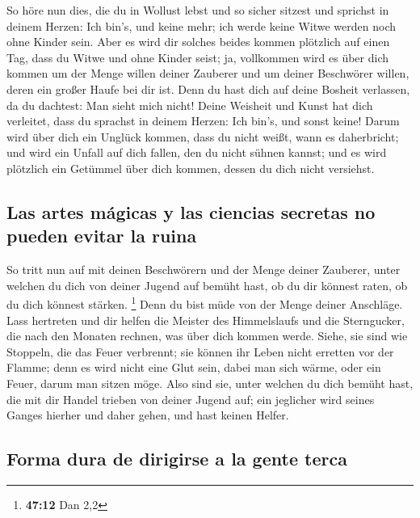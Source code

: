  So höre nun dies, die du in Wollust lebst und so sicher
sitzest und sprichst in deinem Herzen: Ich bin's, und keine mehr; ich
werde keine Witwe werden noch ohne Kinder sein.  Aber es
wird dir solches beides kommen plötzlich auf einen Tag, dass du Witwe
und ohne Kinder seist; ja, vollkommen wird es über dich kommen um der
Menge willen deiner Zauberer und um deiner Beschwörer willen, deren ein
großer Haufe bei dir ist.  Denn du hast dich auf deine
Bosheit verlassen, da du dachtest: Man sieht mich nicht! Deine Weisheit
und Kunst hat dich verleitet, dass du sprachst in deinem Herzen: Ich
bin's, und sonst keine!  Darum wird über dich ein Unglück
kommen, dass du nicht weißt, wann es daherbricht; und wird ein Unfall
auf dich fallen, den du nicht sühnen kannst; und es wird plötzlich ein
Getümmel über dich kommen, dessen du dich nicht versiehst.

\hypertarget{las-artes-muxe1gicas-y-las-ciencias-secretas-no-pueden-evitar-la-ruina}{%
\subsection{Las artes mágicas y las ciencias secretas no pueden evitar
la
ruina}\label{las-artes-muxe1gicas-y-las-ciencias-secretas-no-pueden-evitar-la-ruina}}

 So tritt nun auf mit deinen Beschwörern und der Menge
deiner Zauberer, unter welchen du dich von deiner Jugend auf bemüht
hast, ob du dir könnest raten, ob du dich könnest stärken. \footnote{\textbf{47:12}
  Dan 2,2}  Denn du bist müde von der Menge deiner
Anschläge. Lass hertreten und dir helfen die Meister des Himmelslaufs
und die Sterngucker, die nach den Monaten rechnen, was über dich kommen
werde.  Siehe, sie sind wie Stoppeln, die das Feuer
verbrennt; sie können ihr Leben nicht erretten vor der Flamme; denn es
wird nicht eine Glut sein, dabei man sich wärme, oder ein Feuer, darum
man sitzen möge.  Also sind sie, unter welchen du dich
bemüht hast, die mit dir Handel trieben von deiner Jugend auf; ein
jeglicher wird seines Ganges hierher und daher gehen, und hast keinen
Helfer.

\hypertarget{forma-dura-de-dirigirse-a-la-gente-terca}{%
\subsection{Forma dura de dirigirse a la gente
terca}\label{forma-dura-de-dirigirse-a-la-gente-terca}}

